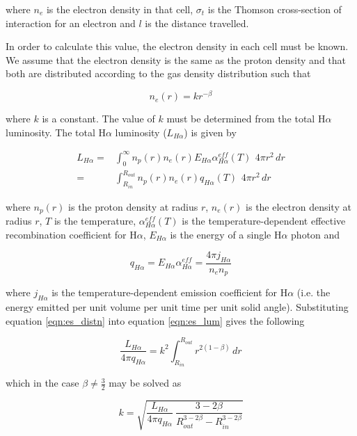 	\noindent where $n_e$ is the electron density in that cell,  $\sigma_t$ is the Thomson cross-section of interaction for an electron and $l$ is the distance travelled.
	
	In order to calculate this value, the electron density in each cell must be known.  We assume that the electron density is the same as the proton density and that both are distributed according to the gas density distribution such that 
	
	\begin{equation}
	\label{eqn:es_distn}
	n_e(r) = kr^{-\beta}
	\end{equation}

	\noindent  where $k$ is a constant.  The value of $k$ must be determined from the total H$\alpha$ luminosity.  The total H$\alpha$ luminosity ($L_{H\alpha}$) is given by
	
	\begin{align}
	L_{H\alpha} =& \int _0 ^{\infty} n_p(r) n_e(r) E_{H\alpha} \alpha^{eff}_{H\alpha}(T) ~ \, 4 \pi r^2 \, dr  \\
			   =& \int _{R_{in}} ^{R_{out}} n_p(r) n_e(r) q_{H\alpha}(T) ~ \, 4 \pi r^2 \, dr \label{eqn:es_lum}
	\end{align}

\noindent where $n_p(r)$ is the proton density at radius $r$, $n_e(r)$ is the electron density at radius $r$, $T$ is the temperature, $\alpha^{eff}_{H\alpha}(T)$ is the temperature-dependent effective recombination coefficient for H$\alpha$, $E_{H\alpha}$ is the energy of a single H$\alpha$ photon and 

\begin{equation}
q_{H\alpha}=E_{H\alpha} \alpha^{eff}_{H\alpha}=\frac{4 \pi j_{H\alpha}}{n_e n_p}
\end{equation}

\noindent where $j_{H\alpha}$ is the temperature-dependent emission coefficient for H$\alpha$ (i.e. the energy emitted per unit volume per unit time per unit solid angle).  Substituting equation \ref{eqn:es_distn} into equation \ref{eqn:es_lum} gives the following

\begin{equation}
\frac{L_{H\alpha}}{4 \pi q_{H\alpha}} = k^2 \int _{R_{in}} ^{R_{out}} r^{2(1-\beta)} \, dr
\end{equation}

which in the case $\beta \ne \frac{3}{2}$ may be solved as 

\begin{equation}
\label{eqn:kcalc1}
k= \sqrt{\frac{L_{H\alpha}}{4 \pi q_{H\alpha}} ~\frac{3-2\beta}{R_{out}^{3-2\beta}-R_{in}^{3-2\beta}}}
\end{equation}

